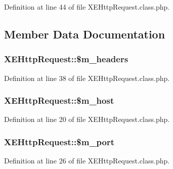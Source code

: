 Definition at line 44 of file X\+E\+Http\+Request.\+class.\+php.



\subsection{Member Data Documentation}
\subsubsection[{\texorpdfstring{\$m\+\_\+headers}{$m_headers}}]{\setlength{\rightskip}{0pt plus 5cm}X\+E\+Http\+Request\+::\$m\+\_\+headers}\hypertarget{classXEHttpRequest_a36df236b46af2f09dd9020096dbaed22}{}\label{classXEHttpRequest_a36df236b46af2f09dd9020096dbaed22}


Definition at line 38 of file X\+E\+Http\+Request.\+class.\+php.

\subsubsection[{\texorpdfstring{\$m\+\_\+host}{$m_host}}]{\setlength{\rightskip}{0pt plus 5cm}X\+E\+Http\+Request\+::\$m\+\_\+host}\hypertarget{classXEHttpRequest_ad88148dced2b42017a96b2a5dd0b533a}{}\label{classXEHttpRequest_ad88148dced2b42017a96b2a5dd0b533a}


Definition at line 20 of file X\+E\+Http\+Request.\+class.\+php.

\subsubsection[{\texorpdfstring{\$m\+\_\+port}{$m_port}}]{\setlength{\rightskip}{0pt plus 5cm}X\+E\+Http\+Request\+::\$m\+\_\+port}\hypertarget{classXEHttpRequest_a35c62f61b5ad2c200c53a58dd43a2784}{}\label{classXEHttpRequest_a35c62f61b5ad2c200c53a58dd43a2784}


Definition at line 26 of file X\+E\+Http\+Request.\+class.\+php.

